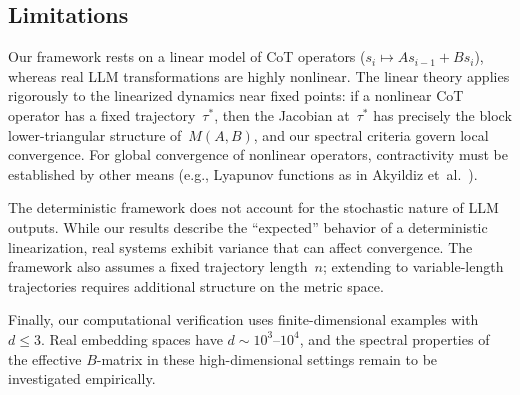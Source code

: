 \subsection{Limitations}

Our framework rests on a linear model of CoT operators ($s_i\mapsto
As_{i-1}+Bs_i$), whereas real LLM transformations are highly nonlinear.
The linear theory applies rigorously to the linearized dynamics near fixed
points: if a nonlinear CoT operator has a fixed trajectory~$\tau^*$, then the
Jacobian at~$\tau^*$ has precisely the block lower-triangular structure
of~$M(A,B)$, and our spectral criteria govern local convergence. For global
convergence of nonlinear operators, contractivity must be established by other
means (e.g., Lyapunov functions as in Akyildiz et~al.~\cite{Akyildiz2025}).

The deterministic framework does not account for the stochastic nature of LLM
outputs. While our results describe the ``expected'' behavior of a
deterministic linearization, real systems exhibit variance that can affect
convergence. The framework also assumes a fixed trajectory length~$n$;
extending to variable-length trajectories requires additional structure on the
metric space.

Finally, our computational verification uses finite-dimensional examples with
$d\leq 3$. Real embedding spaces have $d\sim 10^3$--$10^4$, and the spectral
properties of the effective $B$-matrix in these high-dimensional settings
remain to be investigated empirically.
